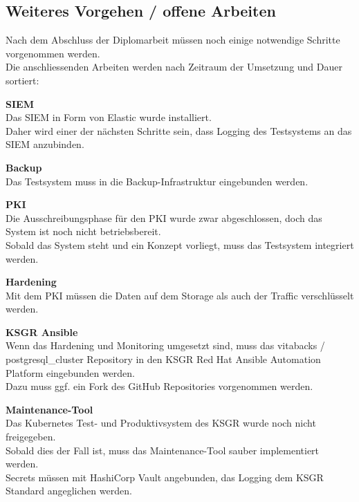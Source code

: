 
\begin{flushleft}
    \section{Weiteres Vorgehen / offene Arbeiten}
    Nach dem Abschluss der Diplomarbeit müssen noch einige notwendige Schritte vorgenommen werden.\\
    Die anschliessenden Arbeiten werden nach Zeitraum der Umsetzung und Dauer sortiert:
    \begin{description}
        \item \textbf{\Gls{SIEM}}\hfill \\Das \Gls{SIEM} in Form von Elastic wurde installiert.\\Daher wird einer der nächsten Schritte sein, dass Logging des Testsystems an das \Gls{SIEM} anzubinden.
        \item \textbf{Backup}\hfill \\Das Testsystem muss in die Backup-Infrastruktur eingebunden werden.
        \item \textbf{\Gls{PKI}}\hfill \\Die Ausschreibungsphase für den \Gls{PKI} wurde zwar abgeschlossen, doch das System ist noch nicht betriebsbereit.\\Sobald das System steht und ein Konzept vorliegt, muss das Testsystem integriert werden.
        \item \textbf{Hardening}\hfill \\Mit dem \Gls{PKI} müssen die Daten auf dem Storage als auch der Traffic verschlüsselt werden.
        \item \textbf{KSGR \Gls{Ansible}}\hfill \\Wenn das Hardening und Monitoring umgesetzt sind, muss das vitabacks / postgresql\_cluster Repository in den KSGR \Gls{Red Hat Ansible Automation Platform} eingebunden werden.\\Dazu muss ggf. ein Fork des  \Gls{GitHub} Repositories vorgenommen werden.
        \item \textbf{Maintenance-Tool}\hfill \\Das \Gls{Kubernetes} Test- und Produktivsystem des KSGR wurde noch nicht freigegeben.\\Sobald dies der Fall ist, muss das Maintenance-Tool sauber implementiert werden.\\Secrets müssen mit HashiCorp Vault\cite{ANQ2ENVU} angebunden, das Logging dem KSGR Standard angeglichen werden.

\end{description}
\end{flushleft}
